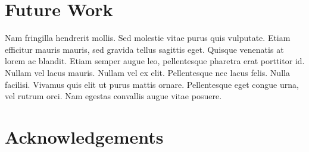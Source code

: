 \section{Future Work}
Nam fringilla hendrerit mollis. Sed molestie vitae purus quis vulputate. Etiam efficitur mauris mauris, sed gravida tellus sagittis eget. Quisque venenatis at lorem ac blandit. Etiam semper augue leo, pellentesque pharetra erat porttitor id. Nullam vel lacus mauris. Nullam vel ex elit. Pellentesque nec lacus felis. Nulla facilisi. Vivamus quis elit ut purus mattis ornare. Pellentesque eget congue urna, vel rutrum orci. Nam egestas convallis augue vitae posuere.

\section{Acknowledgements}

\closepart

